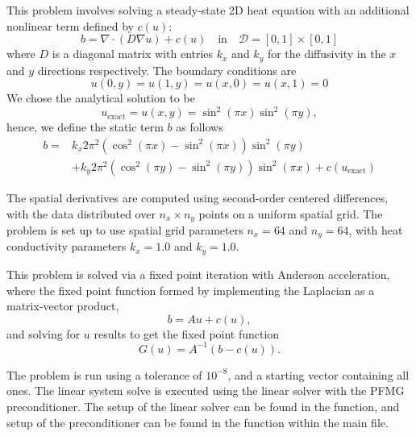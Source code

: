 This problem involves solving a steady-state 2D heat equation with an additional
nonlinear term defined by $c(u)$:
\begin{equation}
  b = \nabla \cdot (D \nabla u) + c(u) \quad \text{in} \quad
  \mathcal{D} = [0,1] \times [0,1]
\end{equation}
where $D$ is a diagonal matrix with entries $k_x$ and $k_y$ for the diffusivity
in the $x$ and $y$ directions respectively. The boundary conditions are
\begin{equation}
    u(0,y) = u(1,y) = u(x,0) = u(x,1) = 0
\end{equation}
We chose the analytical solution to be
\begin{equation}
    u_{\text{exact}} = u(x,y) = \sin^2(\pi x) \sin^2(\pi y),
\end{equation}
hence, we define the static term $b$ as follows
\begin{equation}
\begin{aligned}
    b = &k_x 2 \pi^2 (\cos^2(\pi x) - \sin^2(\pi x)) \sin^2(\pi y) \\
    &+ k_y 2 \pi^2 (\cos^2(\pi y) - \sin^2(\pi y)) \sin^2(\pi x)
    + c(u_{\text{exact}})
\end{aligned}
\end{equation}

The spatial derivatives are computed using second-order centered differences,
with the data distributed over $n_x \times n_y$ points on a uniform spatial
grid.  The problem is set up to use spatial grid parameters $n_x=64$ and
$n_y=64$, with heat conductivity parameters $k_x=1.0$ and $k_y=1.0$.

This problem is solved via a fixed point iteration with Anderson acceleration,
where the fixed point function formed by implementing the Laplacian as a
matrix-vector product,
\begin{equation}
    b = A u + c(u),
\end{equation}
and solving for $u$ results to get the fixed point function
\begin{equation}
    G(u) = A^{-1} (b - c(u)).
\end{equation}

The problem is run using a tolerance of $10^{-8}$, and a starting vector
containing all ones.  The linear system solve is executed using the
 linear solver with the {\hypre} PFMG preconditioner. The
setup of the linear solver can be found in the  function, and
setup of the {\hypre} preconditioner can be found in the 
function within the main file.

